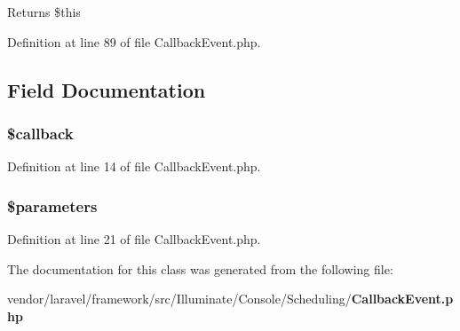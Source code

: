 \begin{DoxyReturn}{Returns}
\$this 
\end{DoxyReturn}


Definition at line 89 of file Callback\+Event.\+php.



\subsection{Field Documentation}
\subsubsection[{\$callback}]{\setlength{\rightskip}{0pt plus 5cm}\${\bf callback}\hspace{0.3cm}{\ttfamily [protected]}}\label{class_illuminate_1_1_console_1_1_scheduling_1_1_callback_event_abc7c2ac0d93d22f71221e8b60512c860}


Definition at line 14 of file Callback\+Event.\+php.

\subsubsection[{\$parameters}]{\setlength{\rightskip}{0pt plus 5cm}\$parameters\hspace{0.3cm}{\ttfamily [protected]}}\label{class_illuminate_1_1_console_1_1_scheduling_1_1_callback_event_ab79d246480c4ac3a0db6bbceca92ad32}


Definition at line 21 of file Callback\+Event.\+php.



The documentation for this class was generated from the following file\+:\begin{DoxyCompactItemize}
\item 
vendor/laravel/framework/src/\+Illuminate/\+Console/\+Scheduling/{\bf Callback\+Event.\+php}\end{DoxyCompactItemize}
